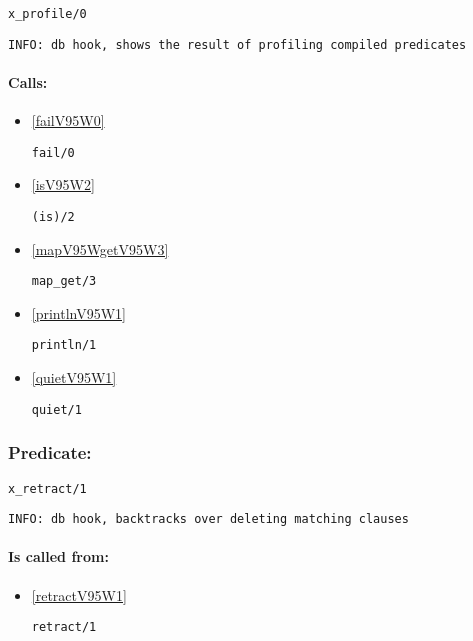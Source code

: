 \begin{verbatim}
x_profile/0
\end{verbatim}

{\small \begin{verbatim}
INFO: db hook, shows the result of profiling compiled predicates

\end{verbatim}}
\paragraph{Calls:} 
\begin{itemize}
\item \ref{failV95W0} 
\begin{verbatim}
fail/0
\end{verbatim}

\item \ref{isV95W2} 
\begin{verbatim}
(is)/2
\end{verbatim}

\item \ref{mapV95WgetV95W3} 
\begin{verbatim}
map_get/3
\end{verbatim}

\item \ref{printlnV95W1} 
\begin{verbatim}
println/1
\end{verbatim}

\item \ref{quietV95W1} 
\begin{verbatim}
quiet/1
\end{verbatim}

\end{itemize}

\subsubsection{Predicate:} \label{xV95WretractV95W1}

\begin{verbatim}
x_retract/1
\end{verbatim}

{\small \begin{verbatim}
INFO: db hook, backtracks over deleting matching clauses

\end{verbatim}}
\paragraph{Is called from:} 
\begin{itemize}
\item \ref{retractV95W1} 
\begin{verbatim}
retract/1
\end{verbatim}

\end{itemize}

